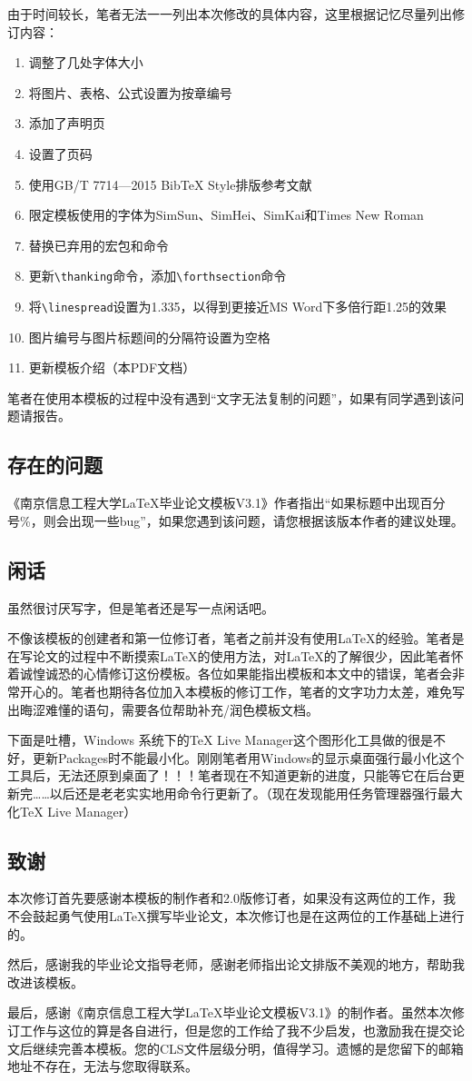 由于时间较长，笔者无法一一列出本次修改的具体内容，这里根据记忆尽量列出修订内容：
\begin{enumerate}[1、]
    \item 调整了几处字体大小
    \item 将图片、表格、公式设置为按章编号
    \item 添加了声明页
    \item 设置了页码
    \item 使用GB/T 7714—2015 BibTeX Style排版参考文献
    \item 限定模板使用的字体为SimSun、SimHei、SimKai和Times New Roman
    \item 替换已弃用的宏包和命令
    \item 更新\verb|\thanking|命令，添加\verb|\forthsection|命令
    \item 将\verb|\linespread|设置为1.335，以得到更接近MS Word下多倍行距1.25的效果
    \item 图片编号与图片标题间的分隔符设置为空格
    \item 更新模板介绍（本PDF文档）
\end{enumerate}

笔者在使用本模板的过程中没有遇到“文字无法复制的问题”，如果有同学遇到该问题请报告。

\subsection{存在的问题}

《南京信息工程大学LaTeX毕业论文模板V3.1》作者指出“如果标题中出现百分号{\color{blue}\%}，则会出现一些bug”，如果您遇到该问题，请您根据该版本作者的建议处理。

\subsection{闲话}

虽然很讨厌写字，但是笔者还是写一点闲话吧。

不像该模板的创建者和第一位修订者，笔者之前并没有使用\LaTeX 的经验。笔者是在写论文的过程中不断摸索\LaTeX 的使用方法，对\LaTeX 的了解很少，因此笔者怀着诚惶诚恐的心情修订这份模板。各位如果能指出模板和本文中的错误，笔者会非常开心的。笔者也期待各位加入本模板的修订工作，笔者的文字功力太差，难免写出晦涩难懂的语句，需要各位帮助补充/润色模板文档。

下面是吐槽，Windows 系统下的TeX Live Manager这个图形化工具做的很是不好，更新Packages时不能最小化。刚刚笔者用Windows的显示桌面强行最小化这个工具后，无法还原到桌面了！！！笔者现在不知道更新的进度，只能等它在后台更新完……以后还是老老实实地用命令行更新了。（现在发现能用任务管理器强行最大化TeX Live Manager）

\subsection{致谢}
本次修订首先要感谢本模板的制作者和2.0版修订者，如果没有这两位的工作，我不会鼓起勇气使用\LaTeX 撰写毕业论文，本次修订也是在这两位的工作基础上进行的。

然后，感谢我的毕业论文指导老师，感谢老师指出论文排版不美观的地方，帮助我改进该模板。

最后，感谢《南京信息工程大学LaTeX毕业论文模板V3.1》的制作者。虽然本次修订工作与这位的算是各自进行，但是您的工作给了我不少启发，也激励我在提交论文后继续完善本模板。您的CLS文件层级分明，值得学习。遗憾的是您留下的邮箱地址不存在，无法与您取得联系。